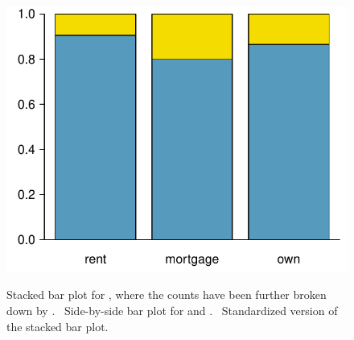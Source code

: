 \begin{figure}[h]
{\includegraphics[width=\loanapptypehomesegbarplotwidth]{ch_summarizing_data/figures/loan_app_type_home_seg_bar/loan_app_type_home_seg_bar_standardized}
\label{loan_app_type_home_seg_bar_standardized}
}
\caption{ Stacked
  bar plot for ,
  where the counts have been further broken down
  by .
  ~Side-by-side
  bar plot for 
  and .
  ~Standardized
  version of the stacked bar plot.}
\label{loan_app_type_home_seg_bar_plot}
\end{figure}

